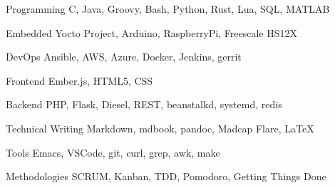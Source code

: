 

\begin{cvskills}

  \cvskill
    {Programming} %
    {C, Java, Groovy, Bash, Python, Rust, Lua, SQL, MATLAB} %

  \cvskill
    {Embedded}
    {Yocto Project, Arduino, RaspberryPi, Freescale HS12X}

  \cvskill
    {DevOps} %
    {Ansible, AWS, Azure, Docker, Jenkins, gerrit} %

  \cvskill
    {Frontend} %
    {Ember.js, HTML5, CSS} %

  \cvskill
    {Backend} %
    {PHP, Flask, Diesel, REST, beanstalkd, systemd, redis} %

  \cvskill
    {Technical Writing} %
    {Markdown, mdbook, pandoc, Madcap Flare, LaTeX} %


  \cvskill
    {Tools}
    {Emacs, VSCode, git, curl, grep, awk, make}


  \cvskill
    {Methodologies} %
    {SCRUM, Kanban, TDD, Pomodoro, Getting Things Done} %

\end{cvskills}

